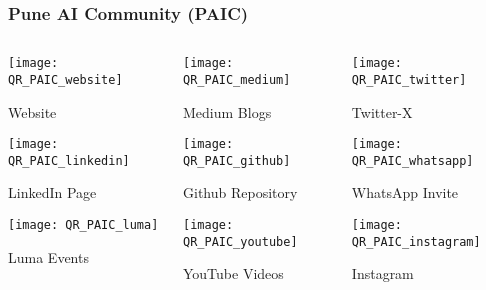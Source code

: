 \begin{frame}[fragile]\frametitle{Pune AI Community (PAIC)}
\begin{columns}
    \begin{column}[T]{0.3\linewidth}
	 
		\begin{center}
		
		\texttt{[image: QR\_PAIC\_website]}
		
				{\tiny Website} %
				
		\texttt{[image: QR\_PAIC\_linkedin]}
		
				{\tiny LinkedIn Page} %
				
		\texttt{[image: QR\_PAIC\_luma]}
		
				{\tiny Luma Events} %
				
		\end{center}		
    \end{column}
    \begin{column}[T]{0.3\linewidth}
		\begin{center}
		
			
		\texttt{[image: QR\_PAIC\_medium]}
		
				{\tiny Medium Blogs}	 %
				
		\texttt{[image: QR\_PAIC\_github]}
		
				{\tiny Github Repository}	 %
						
		\texttt{[image: QR\_PAIC\_youtube]}
		
				{\tiny YouTube Videos}	 %


		\end{center}	
    \end{column}	
    \begin{column}[T]{0.3\linewidth}
	
				
		\begin{center}

		\texttt{[image: QR\_PAIC\_twitter]}
		
				{\tiny Twitter-X} %
						
		\texttt{[image: QR\_PAIC\_whatsapp]}
		
				{\tiny WhatsApp Invite}	 %

		\texttt{[image: QR\_PAIC\_instagram]}
		
				{\tiny Instagram}	 %
		\end{center}	
    \end{column}
  \end{columns}
\end{frame}